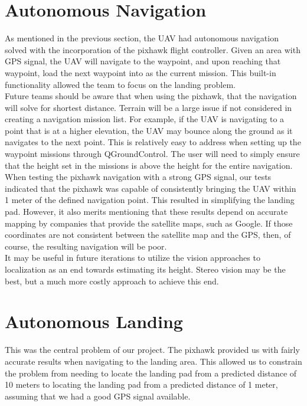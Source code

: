 \section{Autonomous Navigation}
As mentioned in the previous section, the UAV had autonomous navigation solved with the incorporation of the pixhawk flight controller. Given an area with GPS signal, the UAV will navigate to the waypoint, and upon reaching that waypoint, load the next waypoint into as the current mission. This built-in functionality allowed the team to focus on the landing problem.\\

Future teams should be aware that when using the pixhawk, that the navigation will solve for shortest distance. Terrain will be a large issue if not considered in creating a navigation mission list. For example, if the UAV is navigating to a point that is at a higher elevation, the UAV may bounce along the ground as it navigates to the next point. This is relatively easy to address when setting up the waypoint missions through QGroundControl. The user will need to simply ensure that the height set in the missions is above the height for the entire navigation. \\

When testing the pixhawk navigation with a strong GPS signal, our tests indicated that the pixhawk was capable of consistently bringing the UAV within 1 meter of the defined navigation point. This resulted in simplifying the landing pad. However, it also merits mentioning that these results depend on accurate mapping by companies that provide the satellite maps, such as Google. If those coordinates are not consistent between the satellite map and the GPS, then, of course, the resulting navigation will be poor.\\

It may be useful in future iterations to utilize the vision approaches to localization as an end towards estimating its height. Stereo vision may be the best, but a much more costly approach to achieve this end.\\

\section{Autonomous Landing}
This was the central problem of our project. The pixhawk provided us with fairly accurate results when navigating to the landing area. This allowed us to constrain the problem from needing to locate the landing pad from a predicted distance of 10 meters to locating the landing pad from a predicted distance of 1 meter, assuming that we had a good GPS signal available.\\

